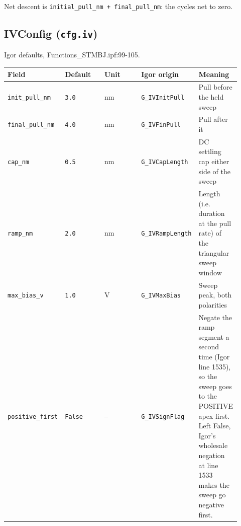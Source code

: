 Net descent is \texttt{initial\_\discretionary{}{}{}pull\_\discretionary{}{}{}nm + final\_\discretionary{}{}{}pull\_\discretionary{}{}{}nm}: the cycles net to zero.

\subsection{IVConfig (\texttt{cfg.\discretionary{}{}{}iv})}

Igor defaults, Functions\_STMBJ.ipf:99-105.

\footnotesize\setlength{\LTleft}{0pt}\setlength{\LTright}{\fill}
\begin{longtable}{@{}>{\raggedright\arraybackslash}p{0.184\linewidth}>{\raggedright\arraybackslash}p{0.184\linewidth}>{\raggedright\arraybackslash}p{0.184\linewidth}>{\raggedright\arraybackslash}p{0.184\linewidth}>{\raggedright\arraybackslash}p{0.184\linewidth}@{}}
\toprule
\textbf{Field} & \textbf{Default} & \textbf{Unit} & \textbf{Igor origin} & \textbf{Meaning} \\
\midrule\endhead
\texttt{init\_\discretionary{}{}{}pull\_\discretionary{}{}{}nm} & \texttt{3.\discretionary{}{}{}0} & nm & \texttt{G\_\discretionary{}{}{}IVInit\discretionary{}{}{}Pull} & Pull before the held sweep \\
\texttt{final\_\discretionary{}{}{}pull\_\discretionary{}{}{}nm} & \texttt{4.\discretionary{}{}{}0} & nm & \texttt{G\_\discretionary{}{}{}IVFin\discretionary{}{}{}Pull} & Pull after it \\
\texttt{cap\_\discretionary{}{}{}nm} & \texttt{0.\discretionary{}{}{}5} & nm & \texttt{G\_\discretionary{}{}{}IVCap\discretionary{}{}{}Length} & DC settling cap either side of the sweep \\
\texttt{ramp\_\discretionary{}{}{}nm} & \texttt{2.\discretionary{}{}{}0} & nm & \texttt{G\_\discretionary{}{}{}IVRamp\discretionary{}{}{}Length} & Length (i.e. duration at the pull rate) of the triangular sweep window \\
\texttt{max\_\discretionary{}{}{}bias\_\discretionary{}{}{}v} & \texttt{1.\discretionary{}{}{}0} & V & \texttt{G\_\discretionary{}{}{}IVMax\discretionary{}{}{}Bias} & Sweep peak, both polarities \\
\texttt{positive\_\discretionary{}{}{}first} & \texttt{False} & -- & \texttt{G\_\discretionary{}{}{}IVSign\discretionary{}{}{}Flag} & Negate the ramp segment a second time (Igor line 1535), so the sweep goes to the POSITIVE apex first. Left False, Igor's wholesale negation at line 1533 makes the sweep go negative first. \\
\bottomrule
\end{longtable}
\normalsize

